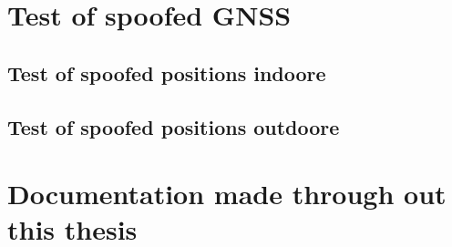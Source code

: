 \section{Test of spoofed GNSS}


\subsection{Test of spoofed positions indoore}
\label{sec:test_of_spoofed_positions_indoore}



\subsection{Test of spoofed positions outdoore}
\label{sec:test_of_spoofed_positions_outdoore}


\section{Documentation made through out this thesis}

